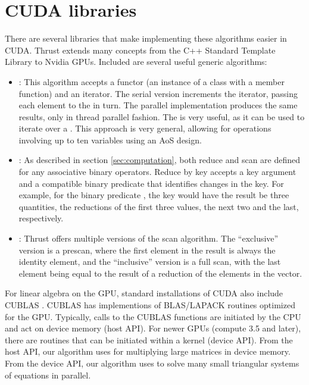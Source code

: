 \appendix
\section{CUDA libraries}
There are several libraries that make implementing these algorithms easier in CUDA. Thrust \citep{thrust} extends many concepts from the C++ Standard Template Library to Nvidia GPUs. Included are several useful generic algorithms:
\begin{itemize}
\item {}: This algorithm accepts a functor (an
  instance of a class with a member  function)
  and an iterator. The serial version increments the iterator, passing
  each element to the  in turn. The parallel implementation
  produces the same results, only in thread parallel fashion. The
   is very useful, as it can be used
  to iterate
  over a . This approach is very general, allowing
  for operations involving up to ten variables using an AoS
  design.

\item {}: As described in section
  \ref{sec:computation}, both reduce and scan are defined for any associative binary operators. Reduce by key accepts a key argument and a compatible binary predicate that identifies changes in the key. For example, for the binary predicate , the key  would have the result be three quantities, the reductions of the first three values, the next two and the last, respectively.

\item {}: Thrust
  offers multiple versions of the scan algorithm. The ``exclusive''
  version is a prescan, where the first element in the result is
  always the identity element, and the ``inclusive'' version is a full
  scan, with the last element being equal to the result of a reduction
  of the elements in the vector.
\end{itemize}

For linear algebra on the GPU, standard installations of CUDA also
include CUBLAS \cite{cublas}. CUBLAS has implementions of BLAS/LAPACK
routines optimized for the GPU. Typically, calls to the CUBLAS
functions are initiated by the CPU and act on device memory (host
API). For newer GPUs (compute 3.5 and later), there are routines that
can be initiated within a kernel (device API). From the host API, our
algorithm uses  for multiplying large matrices in
device memory. From the
device API, our algorithm uses  to solve many small triangular
systems of equations in parallel.

